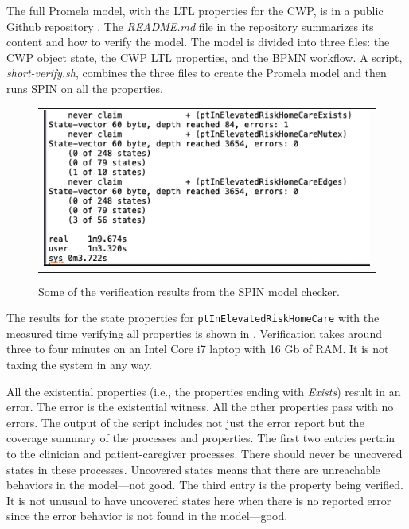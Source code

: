 The full Promela model, with the LTL properties for the CWP, is in a public Github repository \cite{repo}. The \emph{README.md} file in the repository summarizes its content and how to verify the model. The model is divided into three files: the CWP object state, the CWP LTL properties, and the BPMN workflow. A script, \emph{short-verify.sh}, combines the three files to create the Promela model and then runs SPIN on all the properties.

\begin{figure}[t]
  \begin{center}
    \begin{tabular}{c}
      \includegraphics[scale=0.50]{proof-digest.png}
    \end{tabular}
  \end{center}
\caption{Some of the verification results from the SPIN model checker.}
\label{fig:proof}
\end{figure}

The results for the state properties for \texttt{ptInElevatedRiskHomeCare} with the measured time verifying all properties is shown in . Verification takes around three to four minutes on an Intel Core i7 laptop with 16 Gb of RAM. It is not taxing the system in any way. 

All the existential properties (i.e., the properties ending with \emph{Exists}) result in an error. The error is the existential witness. All the other properties pass with no errors. The output of the script includes not just the error report but the coverage summary of the processes and properties. The first two entries pertain to the clinician and patient-caregiver processes. There should never be uncovered states in these processes. Uncovered states means that there are unreachable behaviors in the model---not good. The third entry is the property being verified. It is not unusual to have uncovered states here when there is no reported error since the error behavior is not found in the model---good.

